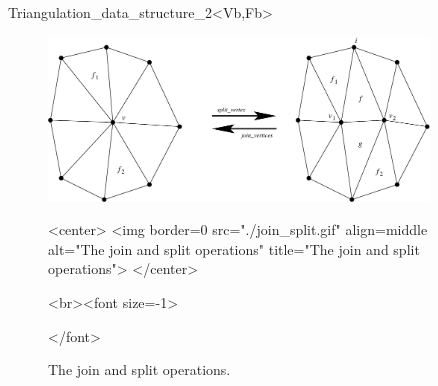 \begin{ccRefClass}{Triangulation_data_structure_2<Vb,Fb>}
\begin{figure}[hb]
\begin{ccTexOnly}
\begin{center}
\includegraphics[width=0.9\textwidth]{TDS_2_ref/join_split}
\end{center}
\end{ccTexOnly}
\begin{ccHtmlOnly}
<center>
<img border=0 src="./join_split.gif" align=middle
alt="The join and split operations"
title="The join and split operations">
</center>
\end{ccHtmlOnly}
\begin{ccHtmlOnly}
<br><font size=-1>
\end{ccHtmlOnly}
\caption{The join and split operations.}\label{fig-tds-split-join}
\begin{ccHtmlOnly}
</font>
\end{ccHtmlOnly}
\end{figure}


\end{ccRefClass}
